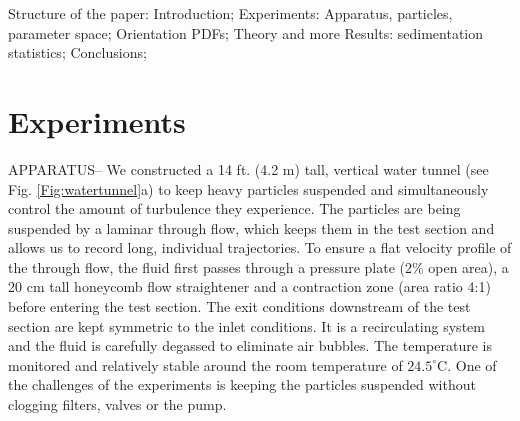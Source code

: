 \documentclass[]{jfm}
\begin{document}
Structure of the paper: Introduction; Experiments: Apparatus, particles, parameter space; Orientation PDFs; Theory and more Results: sedimentation statistics; Conclusions;

\newpage

\section{Experiments}
APPARATUS--  We constructed a 14 ft. (4.2 m) tall, vertical water tunnel (see Fig. \ref{Fig:watertunnel}a) to keep heavy particles suspended and simultaneously control the amount of turbulence they experience.  The particles are being suspended by a laminar through flow, which keeps them in the test section and allows us to record long, individual trajectories.  To ensure a flat velocity profile of the through flow, the fluid first passes through a pressure plate (2\% open area), a 20 cm tall honeycomb flow straightener and a contraction zone (area ratio 4:1) before entering the test section.  The exit conditions downstream of the test section are kept symmetric to the inlet conditions.  It is a recirculating system and the fluid is carefully degassed to eliminate air bubbles. The temperature is monitored and relatively stable around the room temperature of $24.5^{\circ}$C.  One of the challenges of the experiments is keeping the particles suspended without clogging filters, valves or the pump.
\end{document}
